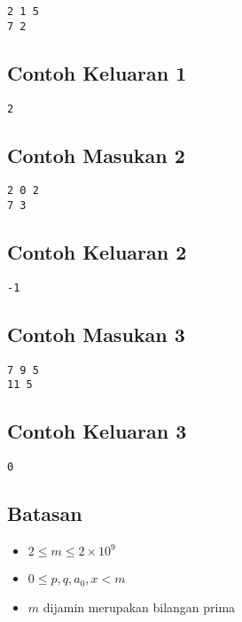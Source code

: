 \documentclass{article}
\begin{document}
\begin{lstlisting}
2 1 5
7 2
\end{lstlisting}

\subsection*{Contoh Keluaran 1}

\begin{lstlisting}
2
\end{lstlisting}

\subsection*{Contoh Masukan 2}

\begin{lstlisting}
2 0 2
7 3
\end{lstlisting}

\subsection*{Contoh Keluaran 2}

\begin{lstlisting}
-1
\end{lstlisting}

\subsection*{Contoh Masukan 3}

\begin{lstlisting}
7 9 5
11 5
\end{lstlisting}

\subsection*{Contoh Keluaran 3}

\begin{lstlisting}
0
\end{lstlisting}

\subsection*{Batasan}

\begin{itemize}
  \item $2 \leq m \leq 2 \times {10}^9$
  \item $0 \leq p, q, a_0, x < m$
  \item $m$ dijamin merupakan bilangan prima
\end{itemize}
\end{document}
